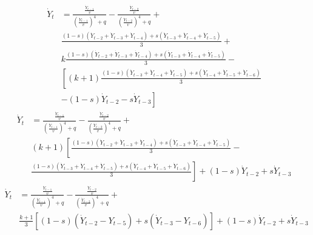\begin{equation*}
\begin{split}
    \dot Y_{t}& = \frac{\frac{\dot Y_{t-1}}{v}}{\left(\frac{\dot Y_{t-1}}{v}\right)^4+q}-\frac{\frac{\dot Y_{t-2}}{v}}{\left(\frac{\dot Y_{t-2}}{v}\right)^4+q} + \\
    & \frac{(1-s)(\dot Y_{t-2}+\dot Y_{t-3}+\dot Y_{t-4})+s(\dot Y_{t-3}+\dot Y_{t-4}+\dot Y_{t-5})}{3} + \\
    &k\frac{(1-s)(\dot Y_{t-2}+\dot Y_{t-3}+\dot Y_{t-4})+s(\dot Y_{t-3}+\dot Y_{t-4}+\dot Y_{t-5})}{3}-\\
    &\left[(k+1)\frac{(1-s)(\dot Y_{t-3}+\dot Y_{t-4}+\dot Y_{t-5})+s(\dot Y_{t-4}+\dot Y_{t-5}+\dot Y_{t-6})}{3}\right.\\
    &\left.-(1-s)\dot Y_{t-2}-s\dot Y_{t-3}\right]
\end{split}
\end{equation*}
\begin{equation*}
\begin{split}
    \dot Y_{t}& = \frac{\frac{\dot Y_{t-1}}{v}}{\left(\frac{\dot Y_{t-1}}{v}\right)^4+q}-\frac{\frac{\dot Y_{t-2}}{v}}{\left(\frac{\dot Y_{t-2}}{v}\right)^4+q} + \\
    & (k+1)\left[\frac{(1-s)(\dot Y_{t-2}+\dot Y_{t-3}+\dot Y_{t-4})+s(\dot Y_{t-3}+\dot Y_{t-4}+\dot Y_{t-5})}{3} -\right.\\
    & \left.\frac{(1-s)(\dot Y_{t-3}+\dot Y_{t-4}+\dot Y_{t-5})+s(\dot Y_{t-4}+\dot Y_{t-5}+\dot Y_{t-6})}{3}\right]+(1-s)\dot Y_{t-2}+s\dot Y_{t-3}
\end{split}
\end{equation*}
\begin{equation}
\begin{split}
    \dot Y_{t}& = \frac{\frac{\dot Y_{t-1}}{v}}{\left(\frac{\dot Y_{t-1}}{v}\right)^4+q}-\frac{\frac{\dot Y_{t-2}}{v}}{\left(\frac{\dot Y_{t-2}}{v}\right)^4+q} + \\
    & \frac{k+1}{3}\left[(1-s)(\dot Y_{t-2}-Y_{t-5})+s(\dot Y_{t-3}-Y_{t-6})\right]+(1-s)\dot Y_{t-2}+s\dot Y_{t-3}
\end{split}
\end{equation}

